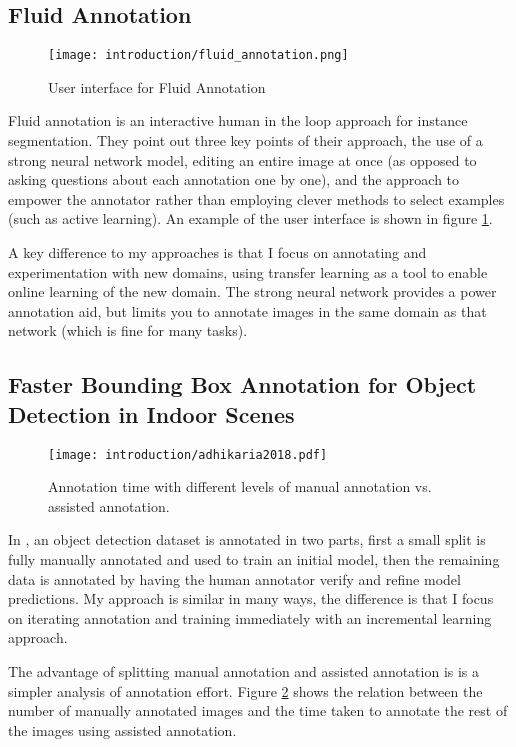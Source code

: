 \subsection{Fluid Annotation \cite{Andriluka2018}}
\begin{figure}[h]
  \centering
  \texttt{[image: introduction/fluid\_annotation.png]}
  \caption{User interface for Fluid Annotation \cite{Andriluka2018}}  
  \label{fig:fluid_annotation}
\end{figure}

Fluid annotation is an interactive human in the loop approach for instance segmentation. They point out three key points of their approach, the use of a strong neural network model, editing an entire image at once (as opposed to asking questions about each annotation one by one), and the approach to empower the annotator rather than employing clever methods to select examples (such as active learning). An example of the user interface is shown in figure \ref{fig:fluid_annotation}.

A key difference to my approaches is that I focus on annotating and experimentation with new domains, using transfer learning as a tool to enable online learning of the new domain. The strong neural network provides a power annotation aid, but limits you to annotate images in the same domain as that network (which is fine for many tasks).

\subsection{Faster Bounding Box Annotation for Object Detection in Indoor Scenes}

\begin{figure}[h]
  \centering
  \texttt{[image: introduction/adhikaria2018.pdf]}
  \caption{Annotation time with different levels of manual annotation vs. assisted annotation. \cite{Adhikaria2018}}  
  \label{fig:adhikaria2018}
\end{figure}

In \cite{Adhikaria2018}, an object detection dataset is annotated in two parts, first a small split is fully manually annotated and used to train an initial model, then the remaining data is annotated by having the human annotator verify and refine model predictions. My approach is similar in many ways, the difference is that I focus on iterating annotation and training immediately with an incremental learning approach.

The advantage of splitting manual annotation and assisted annotation is is a simpler analysis of annotation effort. Figure \ref{fig:adhikaria2018} shows the relation between the number of manually annotated images and the time taken to annotate the rest of the images using assisted annotation.



